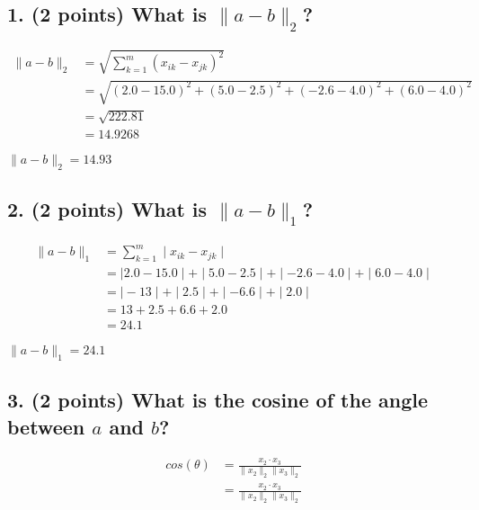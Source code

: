 \documentclass[11pt]{article}
\begin{document}
\subsection*{\textbf{1. (2 points)} What is $\|a-b\|_2$?}

\begin{align*}
    \|a-b\|_2 &= \sqrt{ \sum_{k=1}^{m} ( x_{ik} - x_{jk} )^{2} } \\
    & = \sqrt{ ( 2.0 - 15.0 )^{2} + ( 5.0 - 2.5 )^{2} + ( -2.6 - 4.0 )^{2} + ( 6.0 - 4.0 )^{2} } \\
    & = \sqrt{ 222.81 } \\
    & = 14.9268
\end{align*}

\begin{tcolorbox}[title=Problem 3.1]
    $\|a-b\|_2 = 14.93$
\end{tcolorbox}


\subsection*{\textbf{2. (2 points)} What is $\|a-b\|_1$?}

\begin{align*}
    \|a-b\|_1 &= \sum_{k=1}^{m}  \mid x_{ik} - x_{jk} \mid  \\
    &= \mid 2.0 - 15.0 \mid + \mid 5.0 - 2.5 \mid + \mid -2.6 - 4.0 \mid + \mid 6.0 - 4.0 \mid \\
    &= \mid -13 \mid + \mid 2.5 \mid + \mid -6.6 \mid + \mid 2.0 \mid \\
    &= 13 + 2.5 + 6.6 + 2.0 \\
    &= 24.1
\end{align*}

\begin{tcolorbox}[title=Problem 3.2]
    $\|a-b\|_1 = 24.1$
\end{tcolorbox}

\subsection*{\textbf{3. (2 points)} What is the cosine of the angle between $a$ and $b$?}

\begin{align*}
    cos(\theta) &= \frac{ x_2 \cdot x_3 }{ \| x_2 \|_2 \| x_3 \|_2 }  \\
    &= \frac{ x_2 \cdot x_3 }{ \| x_2 \|_2 \| x_3 \|_2 }
\end{align*}
\end{document}

